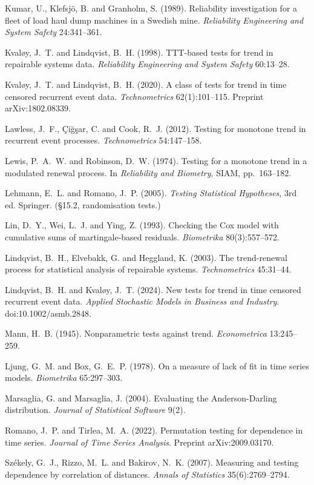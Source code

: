 \documentclass[11pt,a4paper]{article}
\begin{document}
\begin{description}[leftmargin=1.2em,labelindent=0em,itemsep=1pt,font=\normalfont]
\item Kumar, U., Klefsjö, B. and Granholm, S. (1989). Reliability investigation for a
fleet of load haul dump machines in a Swedish mine. \emph{Reliability Engineering and
System Safety} 24:341--361.
\item Kvaløy, J.~T. and Lindqvist, B.~H. (1998). TTT-based tests for trend in repairable
systems data. \emph{Reliability Engineering and System Safety} 60:13--28.
\item Kvaløy, J.~T. and Lindqvist, B.~H. (2020). A class of tests for trend in time
censored recurrent event data. \emph{Technometrics} 62(1):101--115.
Preprint arXiv:1802.08339.
\item Lawless, J.~F., Çiğşar, C. and Cook, R.~J. (2012). Testing for monotone trend in
recurrent event processes. \emph{Technometrics} 54:147--158.
\item Lewis, P.~A.~W. and Robinson, D.~W. (1974). Testing for a monotone trend in a
modulated renewal process. In \emph{Reliability and Biometry}, SIAM, pp.~163--182.
\item Lehmann, E.~L. and Romano, J.~P. (2005). \emph{Testing Statistical Hypotheses},
3rd ed. Springer. (\S 15.2, randomisation tests.)
\item Lin, D.~Y., Wei, L.~J. and Ying, Z. (1993). Checking the Cox model with cumulative
sums of martingale-based residuals. \emph{Biometrika} 80(3):557--572.
\item Lindqvist, B.~H., Elvebakk, G. and Heggland, K. (2003). The trend-renewal process
for statistical analysis of repairable systems. \emph{Technometrics} 45:31--44.
\item Lindqvist, B.~H. and Kvaløy, J.~T. (2024). New tests for trend in time censored
recurrent event data. \emph{Applied Stochastic Models in Business and Industry}.
doi:10.1002/asmb.2848.
\item Mann, H.~B. (1945). Nonparametric tests against trend. \emph{Econometrica}
13:245--259.
\item Ljung, G.~M. and Box, G.~E.~P. (1978). On a measure of lack of fit in time series
models. \emph{Biometrika} 65:297--303.
\item Marsaglia, G. and Marsaglia, J. (2004). Evaluating the Anderson-Darling
distribution. \emph{Journal of Statistical Software} 9(2).
\item Romano, J.~P. and Tirlea, M.~A. (2022). Permutation testing for dependence in time
series. \emph{Journal of Time Series Analysis}. Preprint arXiv:2009.03170.
\item Székely, G.~J., Rizzo, M.~L. and Bakirov, N.~K. (2007). Measuring and testing
dependence by correlation of distances. \emph{Annals of Statistics} 35(6):2769--2794.
\end{description}
\end{document}
